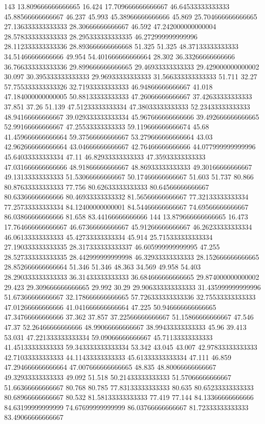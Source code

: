 143 13.809666666666665 16.424 17.709666666666667 46.64533333333333 45.88566666666667 46.237 45.993 45.38966666666666 45.869 25.704666666666665 27.136333333333333 28.30666666666667 46.592 47.242000000000004 28.578333333333333 28.295333333333335 46.272999999999996 28.112333333333336 28.893666666666668 51.325 51.325 48.37133333333333 34.51466666666666 49.954 54.401666666666664 28.302 36.33266666666666 36.766333333333336 29.899666666666665 29.46933333333333 29.429000000000002 30.097 30.395333333333333 29.96933333333333 31.566333333333333 51.711 32.27 57.755333333333326 32.71933333333333 46.94866666666667 41.018 47.184000000000005 50.88133333333333 47.26066666666667 37.42633333333333 37.851 37.26 51.139 47.51233333333334 47.38033333333333 52.23433333333333 48.94166666666667 39.029333333333334 45.967666666666666 39.492666666666665 52.99166666666667 47.25533333333333 59.119666666666674 45.68 41.459666666666664 59.37566666666667 53.279666666666664 43.03 42.962666666666664 43.04666666666667 42.76466666666666 44.077999999999996 45.64033333333334 47.11 46.82933333333333 47.35933333333333 47.031666666666666 48.91866666666667 48.86933333333333 49.30166666666667 49.13133333333333 51.53066666666667 50.17466666666667 51.603 51.737 80.866 80.87633333333333 77.756 80.62633333333333 80.64566666666667 80.63366666666666 80.46933333333332 81.56566666666667 77.32133333333334 77.25733333333334 84.12400000000001 84.54466666666667 74.69566666666667 86.03866666666666 81.658 83.44166666666666
144 13.879666666666665 16.473 17.764666666666667 46.67366666666667 45.91266666666667 46.26233333333334 46.06133333333333 45.42733333333334 45.914 25.715333333333334 27.190333333333335 28.317333333333337 46.605999999999995 47.255 28.527333333333335 28.442999999999998 46.32933333333333 28.152666666666665 28.852666666666664 51.346 51.346 48.363 34.569 49.958 54.403 28.290333333333333 36.31433333333333 36.684666666666665 29.874000000000002 29.423 29.309666666666665 29.992 30.29 29.906333333333333 31.435999999999996 51.67366666666667 32.178666666666665 57.726333333333336 32.75533333333333 47.01266666666666 41.041666666666664 47.225 50.946666666666665 47.34766666666666 37.362 37.857 37.22566666666667 51.15866666666667 47.546 47.37 52.26466666666666 48.99066666666667 38.99433333333333 45.96 39.413 53.031 47.221333333333334 59.09066666666667 45.71133333333333 41.45133333333333 59.343333333333334 53.342 43.045 43.007 42.97833333333333 42.71033333333333 44.11433333333333 45.61333333333334 47.111 46.859 47.294666666666664 47.007666666666665 48.835 48.80066666666667 49.32933333333333 49.092 51.518 50.21433333333333 51.57066666666667 51.66366666666667 80.768 80.785 77.83133333333333 80.635 80.65233333333333 80.68966666666667 80.532 81.58133333333333 77.419 77.144 84.13366666666666 84.63199999999999 74.67699999999999 86.03766666666667 81.72333333333333 83.49066666666667
